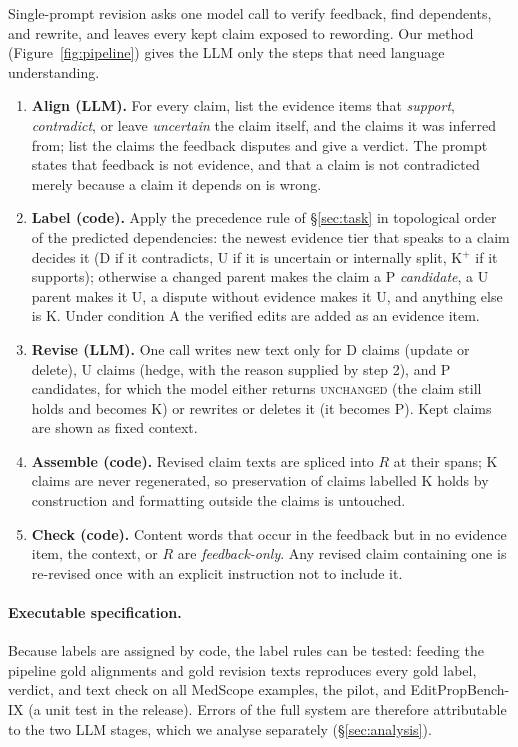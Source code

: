\documentclass[11pt]{article}
\newcommand{\D}{\textsc{D}}
\newcommand{\Pp}{\textsc{P}}
\newcommand{\K}{\textsc{K}}
\newcommand{\U}{\textsc{U}}
\newcommand{\ms}{MedScope}
\begin{document}
Single-prompt revision asks one model call to verify feedback, find dependents, and rewrite, and leaves every kept claim exposed to rewording. Our method (Figure~\ref{fig:pipeline}) gives the LLM only the steps that need language understanding.
\begin{enumerate}\itemsep0pt
  \item \textbf{Align (LLM).} For every claim, list the evidence items that \emph{support}, \emph{contradict}, or leave \emph{uncertain} the claim itself, and the claims it was inferred from; list the claims the feedback disputes and give a verdict. The prompt states that feedback is not evidence, and that a claim is not contradicted merely because a claim it depends on is wrong.
  \item \textbf{Label (code).} Apply the precedence rule of \S\ref{sec:task} in topological order of the predicted dependencies: the newest evidence tier that speaks to a claim decides it (\D{} if it contradicts, \U{} if it is uncertain or internally split, \K$^{+}$ if it supports); otherwise a changed parent makes the claim a \Pp{} \emph{candidate}, a \U{} parent makes it \U, a dispute without evidence makes it \U, and anything else is \K. Under condition A the verified edits are added as an evidence item.
  \item \textbf{Revise (LLM).} One call writes new text only for \D{} claims (update or delete), \U{} claims (hedge, with the reason supplied by step 2), and \Pp{} candidates, for which the model either returns \textsc{unchanged} (the claim still holds and becomes \K) or rewrites or deletes it (it becomes \Pp). Kept claims are shown as fixed context.
  \item \textbf{Assemble (code).} Revised claim texts are spliced into $R$ at their spans; \K{} claims are never regenerated, so preservation of claims labelled \K{} holds by construction and formatting outside the claims is untouched.
  \item \textbf{Check (code).} Content words that occur in the feedback but in no evidence item, the context, or $R$ are \emph{feedback-only}. Any revised claim containing one is re-revised once with an explicit instruction not to include it.
\end{enumerate}

\paragraph{Executable specification.} Because labels are assigned by code, the label rules can be tested: feeding the pipeline gold alignments and gold revision texts reproduces every gold label, verdict, and text check on all \ms{} examples, the pilot, and EditPropBench-IX (a unit test in the release). Errors of the full system are therefore attributable to the two LLM stages, which we analyse separately (\S\ref{sec:analysis}).
\end{document}
